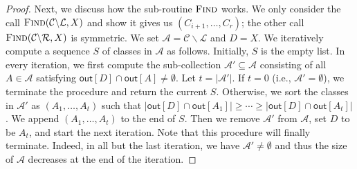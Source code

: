 \documentclass[11pt]{article}
\begin{document}
\begin{proof}
Next, we discuss how the sub-routine $\textsc{Find}$ works.
We only consider the call $\textsc{Find}(\mathcal{C} \backslash \mathcal{L},X)$ and show it gives us $(C_{i+1},\dots,C_r)$; the other call $\textsc{Find}(\mathcal{C} \backslash \mathcal{R},X)$ is symmetric.
We set $\mathcal{A} = \mathcal{C} \backslash \mathcal{L}$ and $D = X$.
We iteratively compute a sequence $S$ of classes in $\mathcal{A}$ as follows.
Initially, $S$ is the empty list.
In every iteration, we first compute the sub-collection $\mathcal{A}' \subseteq \mathcal{A}$ consisting of all $A \in \mathcal{A}$ satisfying $\mathsf{out}[D] \cap \mathsf{out}[A] \neq \emptyset$.
Let $t = |\mathcal{A}'|$.
If $t = 0$ (i.e., $\mathcal{A}' = \emptyset$), we terminate the procedure and return the current $S$.
Otherwise, we sort the classes in $\mathcal{A}'$ as $(A_1,\dots,A_t)$ such that $|\mathsf{out}[D] \cap \mathsf{out}[A_1]| \geq \cdots \geq |\mathsf{out}[D] \cap \mathsf{out}[A_t]|$.
We append $(A_1,\dots,A_t)$ to the end of $S$.
Then we remove $\mathcal{A}'$ from $\mathcal{A}$, set $D$ to be $A_t$, and start the next iteration.
Note that this procedure will finally terminate.
Indeed, in all but the last iteration, we have $\mathcal{A}' \neq \emptyset$ and thus the size of $\mathcal{A}$ decreases at the end of the iteration.


\end{proof}
\end{document}
